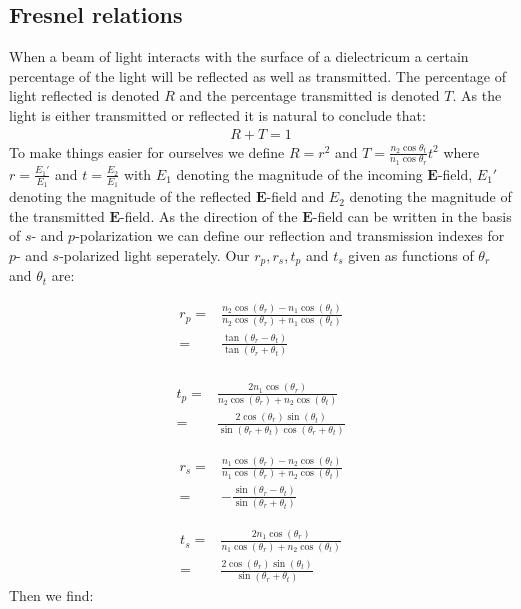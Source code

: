 \subsection{Fresnel relations}
When a beam of light interacts with the surface of a dielectricum a certain percentage of the light will be reflected as well as transmitted. The percentage of light reflected is denoted $R$ and the percentage transmitted is denoted $T$. As the light is either transmitted or reflected it is natural to conclude that:
%
\begin{align}
R+T=1
\end{align}
%
To make things easier for ourselves we define $R=r^2$ and $T=\frac{n_2\cos{\theta_t}}{n_1\cos{\theta_r}}t^2$ where $r=\frac{E_1'}{E_1}$ and  $t=\frac{E_2}{E_1}$ with $E_1$ denoting the magnitude of the incoming $\textbf{E}$-field, $E_1'$ denoting the magnitude of the reflected $\textbf{E}$-field and $E_2$ denoting the magnitude of the transmitted $\textbf{E}$-field. As the direction of the $\textbf{E}$-field can be written in the basis of $s$- and $p$-polarization we can define our reflection and transmission indexes for $p$- and $s$-polarized light seperately. Our $r_p,r_s,t_p$ and $t_s$ given as functions of $\theta_r$ and $\theta_t$ are:

\begin{align}
r_p = & \frac{n_{2}\cos(\theta_r)-n_1\cos(\theta_t)}{n_2\cos(\theta_r)+n_1\cos(\theta_t)}\\
= & \frac{\tan(\theta_r-\theta_t)}{\tan(\theta_r+\theta_t)}\\
\end{align}

\begin{align}
t_p = & \frac{2n_1\cos(\theta_r)}{n_2\cos(\theta_r)+n_2\cos(\theta_t)} \\
= &\frac{2\cos(\theta_r)\sin(\theta_t)}{\sin(\theta_r+\theta_t)\cos(\theta_r+\theta_t)}
\end{align}

\begin{align}
r_s = & \frac{n_1\cos(\theta_r)-n_2\cos(\theta_t)}{n_1\cos(\theta_r)+n_2\cos(\theta_t)}\\
= & -\frac{\sin(\theta_r-\theta_t)}{\sin(\theta_r+\theta_t)}
\end{align}

\begin{align}
t_s = & \frac{2n_1\cos(\theta_r)}{n_1\cos(\theta_r)+n_2\cos(\theta_t)}\\
= & \frac{2\cos(\theta_r)\sin(\theta_t)}{\sin(\theta_r+\theta_t)}
\end{align}
%
Then we find:

